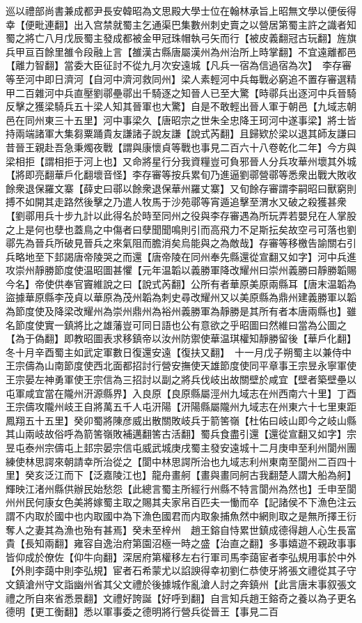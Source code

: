 巡以禮部尚書兼成都尹長安韓昭為文思殿大學士位在翰林承旨上昭無文學以便佞得幸【便毗連翻】出入宫禁就蜀主乞通渠巴集數州刺史賣之以營居第蜀主許之識者知蜀之將亡八月戊辰蜀主發成都被金甲冠珠帽執弓矢而行【被皮義翻冠古玩翻】旌旗兵甲亘百餘里雒令段融上言【雒漢古縣唐屬漢州為州治所上時掌翻】不宜遠離都邑【離力智翻】當委大臣征討不從九月次安遠城【凡兵一宿為信過宿為次】　李存審等至河中即日濟河【自河中濟河救同州】梁人素輕河中兵每戰必窮追不置存審選精甲二百雜河中兵直壓劉鄩壘鄩出千騎逐之知晉人已至大驚【時鄩兵出逐河中兵晉騎反擊之獲梁騎兵五十梁人知其晉軍也大驚】自是不敢輕出晉人軍于朝邑【九域志朝邑在同州東三十五里】河中事梁久【唐昭宗之世朱全忠降王珂河中遂事梁】將士皆持兩端諸軍大集芻粟踊貴友謙諸子說友謙【說式芮翻】且歸欵於梁以退其師友謙曰昔晉王親赴吾急秉燭夜戰【謂與康懷貞等戰也事見二百六十八卷乾化二年】今方與梁相拒【謂相拒于河上也】又命將星行分我資糧豈可負邪晉人分兵攻華州壞其外城【將即亮翻華戶化翻壞音怪】李存審等按兵累旬乃進逼劉鄩營鄩等悉衆出戰大敗收餘衆退保羅文寨【薛史曰鄩以餘衆退保華州羅丈寨】又旬餘存審謂李嗣昭曰獸窮則搏不如開其走路然後擊之乃遣人牧馬于沙苑鄩等宵遁追擊至渭水又破之殺獲甚衆【劉鄩用兵十步九計以此得名於時至同州之役與李存審遇為所玩弄若嬰兒在人掌股之上是何也孽也蓋鳥之中傷者曰孽聞聞鳴則引而高飛力不足斯抎矣故空弓可落也劉鄩先為晉兵所破見晉兵之來氣阻而膽消矣烏能與之為敵哉】存審等移檄告諭關右引兵略地至下邽謁唐帝陵哭之而還【唐帝陵在同州奉先縣還從宣翻又如字】河中兵進攻崇州靜勝節度使温昭圖甚懼【元年温韜以義勝軍降改耀州曰崇州義勝曰靜勝韜賜今名】帝使供奉官竇維說之曰【說式芮翻】公所有者華原美原兩縣耳【唐末温韜為盜據華原縣李茂貞以華原為茂州韜為刺史尋改耀州又以美原縣為鼎州建義勝軍以韜為節度使及降梁改耀州為崇州鼎州為裕州義勝軍為靜勝是其所有者本唐兩縣也】雖名節度使實一鎮將比之雄藩豈可同日語也公有意欲之乎昭圖曰然維曰當為公圖之【為于偽翻】即教昭圖表求移鎮帝以汝州防禦使華温琪權知靜勝留後【華戶化翻】　冬十月辛酉蜀主如武定軍數日復還安遠【復扶又翻】　十一月戊子朔蜀主以兼侍中王宗儔為山南節度使西北面都招討行營安撫使天雄節度使同平章事王宗昱永寧軍使王宗晏左神勇軍使王宗信為三招討以副之將兵伐岐出故關壁於咸宜【壁者築壁壘以屯軍咸宜當在隴州汧源縣界】入良原【良原縣屬涇州九域志在州西南六十里】丁酉王宗儔攻隴州岐王自將萬五千人屯汧陽【汧陽縣屬隴州九域志在州東六十七里東距鳳翔五十五里】癸卯蜀將陳彦威出散關敗岐兵于箭筈嶺【杜佑曰岐山即今之岐山縣其山兩岐故俗呼為箭筈嶺敗補邁翻筈古活翻】蜀兵食盡引還【還從宣翻又如字】宗昱屯泰州宗儔屯上邽宗晏宗信屯威武城庚戌蜀主發安遠城十二月庚申至利州閬州團練使林思諤來朝請幸所治從之【閬中林思諤所治也九域志利州東南至閬州二百四十里】癸亥泛江而下【泛嘉陵江也】龍舟畫舸【畫與畫同舸古我翻楚人謂大船為舸】輝映江渚州縣供辦民始愁怨【此總言蜀主所經行州縣不特言閬州為然也】壬申至閬州州民何康女色美將嫁蜀主取之賜其夫家帛百匹夫一慟而卒【記諸侯不下漁色注云謂不内取於國中也内取國中為下漁色國君而内取象捕魚然中網則取之是無所擇王衍奪人之妻其為漁也殆有甚焉】癸未至梓州　趙王鎔自恃累世鎮成德得趙人心生長富貴【長知兩翻】雍容自逸治府第園沼極一時之盛【治直之翻】多事嬉遊不親政事事皆仰成於僚佐【仰牛向翻】深居府第權移左右行軍司馬李藹宦者李弘規用事於中外【外則李藹中則李弘規】宦者石希蒙尤以諂諛得幸初劉仁恭使牙將張文禮從其子守文鎮滄州守文詣幽州省其父文禮於後據城作亂滄人討之奔鎮州【此言唐末事叙張文禮之所自來省悉景翻】文禮好誇誕【好呼到翻】自言知兵趙王鎔奇之養以為子更名德明【更工衡翻】悉以軍事委之德明將行營兵從晉王【事見二百